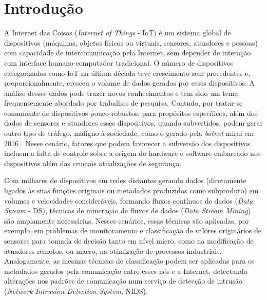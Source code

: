 \chapter{Introdução}\label{cha:intro}

\newcommand{\iot}{IoT\xspace}

A Internet das Coisas (\emph{Internet of Things} - IoT) é um sistema global de
dispositivos (máquinas, objetos físicos ou virtuais, sensores, atuadores e
pessoas) com capacidade de intercomunicação pela Internet, sem depender de
interação com interface humano-computador tradicional.
O número de dispositivos categorizados como IoT na última década teve
crescimento sem precedentes e, proporcionalmente, cresceu o volume de dados
gerados por esses dispositivos.
A análise desses dados pode trazer novos conhecimentos e tem sido um tema frequentemente
abordado por trabalhos de pesquisa.
Contudo, por tratar-se comumente de dispositivos pouco robustos, para propósitos específicos,
além dos dados de sensores e atuadores esses dispositivos, quando subvertidos,
podem gerar outro tipo de tráfego, maligno à sociedade, como o gerado pela
\emph{botnet} mirai em 2016 \cite{Kambourakis2017}.
Nesse cenário, fatores que podem favorecer a subversão dos dispositivos incluem a
falta de controle sobre a origem do hardware e software embarcado nos
dispositivos além das cruciais atualizações de segurança.


\newcommand{\ds}{DS\xspace}

Com milhares de dispositivos em redes distantes gerando dados (diretamente
ligados às suas funções originais ou metadados produzidos como subproduto) em
volumes e velocidades consideráveis, formando fluxos contínuos de dados (\emph{Data
Stream} - DS), técnicas de mineração de fluxos de dados
(\emph{Data Stream Mining}) são amplamente necessárias.
Nesses cenários, essas técnicas são
aplicadas, por exemplo, em problemas de monitoramento e classificação de valores
originários de sensores para tomada de decisão tanto em nível micro, como na
modificação de atuadores remotos, ou macro, na otimização de processos
industriais.
Analogamente, as mesmas técnicas de classificação podem ser aplicadas para os
metadados gerados pela comunicação entre esses nós e a Internet, detectando
alterações nos padrões de comunicação num serviço de detecção de intrusão
(\emph{Network Intrusion Detection System}, NIDS).

